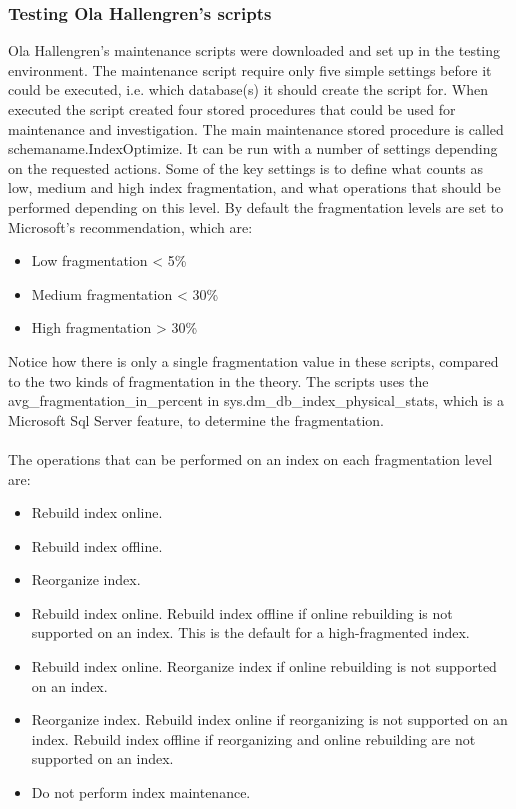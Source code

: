 \documentclass{cslthse-msc}
\begin{document}
\subsubsection{Testing Ola Hallengren's scripts}
Ola Hallengren's maintenance scripts were downloaded and set up in the testing environment. The maintenance script require only five simple settings before it could be executed, i.e. which database(s) it should create the script for. When executed the script created four stored procedures that could be used for maintenance and investigation. The main maintenance stored procedure is called schemaname.IndexOptimize. It can be run with a number of settings depending on the requested actions. Some of the key settings is to define what counts as low, medium and high index fragmentation, and what operations that should be performed depending on this level. By default the fragmentation levels are set to Microsoft's recommendation, which are:
\begin{itemize}
\item Low fragmentation < 5\%
\item Medium fragmentation < 30\%
\item High fragmentation > 30\%
\end{itemize}
Notice how there is only a single fragmentation value in these scripts, compared to the two kinds of fragmentation in the theory. The scripts uses the avg\_fragmentation\_in\_percent in sys.dm\_db\_index\_physical\_stats, which is a Microsoft Sql Server feature, to determine the fragmentation.\\\\
The operations that can be performed on an index on each fragmentation level are:
\begin{itemize}
\item Rebuild index online.
\item Rebuild index offline.
\item Reorganize index.
\item Rebuild index online. Rebuild index offline if online rebuilding is not supported on an index. This is the default for a high-fragmented index.
\item Rebuild index online. Reorganize index if online rebuilding is not supported on an index.
\item  Reorganize index. Rebuild index online if reorganizing is not supported on an index. Rebuild index offline if reorganizing and online rebuilding are not supported on an index. 
\item Do not perform index maintenance.
\end{itemize}
\end{document}

